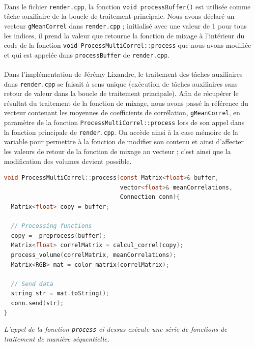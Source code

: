  \paragraph{}
 Dans le fichier \verb!render.cpp!, la fonction
 \verb!void processBuffer()! est utilisée comme tâche auxiliaire de la
 boucle de traitement principale. Nous avons déclaré un vecteur
 \verb!gMeanCorrel! dans \verb!render.cpp! ; initialisé avec une valeur
 de 1 pour tous les indices, il prend la valeur que retourne la
 fonction de mixage à l'intérieur du code de la fonction
 \verb!void ProcessMultiCorrel::process!
 que nous avons modifiée et qui est appelée dans \verb!processBuffer!
 de \verb!render.cpp!.
 \paragraph{}
 Dans l'implémentation de Jérémy Lixandre, le traitement des tâches
 auxiliaires dans \verb!render.cpp! se faisait à sens unique
 (exécution de tâches auxiliaires sans retour de valeur dans la boucle
 de traitement principale). Afin de récupérer le résultat du
 traitement de la fonction de mixage, nous avons passé la référence du
 vecteur contenant les moyennes de coefficients de corrélation,
 \verb!gMeanCorrel!, en paramètre de la fonction
 \verb!ProcessMultiCorrel::process! lors de son appel dans la fonction
 principale de \verb!render.cpp!. On accède ainsi à la case mémoire de
 la variable pour permettre à la fonction de modifier son contenu et
 ainsi d'affecter les valeurs de retour de la fonction de mixage au
 vecteur ; c'est ainsi que la modification des volumes devient
 possible.

 \begin{lstlisting}[language=C, frame=single, breaklines=true]
void ProcessMultiCorrel::process(const Matrix<float>& buffer,
                                 vector<float>& meanCorrelations,
                                 Connection conn){
  Matrix<float> copy = buffer;

  // Processing functions
  copy = _preprocess(buffer);
  Matrix<float> correlMatrix = calcul_correl(copy);
  process_volume(correlMatrix, meanCorrelations);
  Matrix<RGB> mat = color_matrix(correlMatrix);

  // Send data
  string str = mat.toString();
  conn.send(str);
}
 \end{lstlisting}
 \begin{center}
  \textit{L'appel de la fonction \verb!process! ci-dessus exécute une série de fonctions de traitement de manière séquentielle.}
 \end{center}


